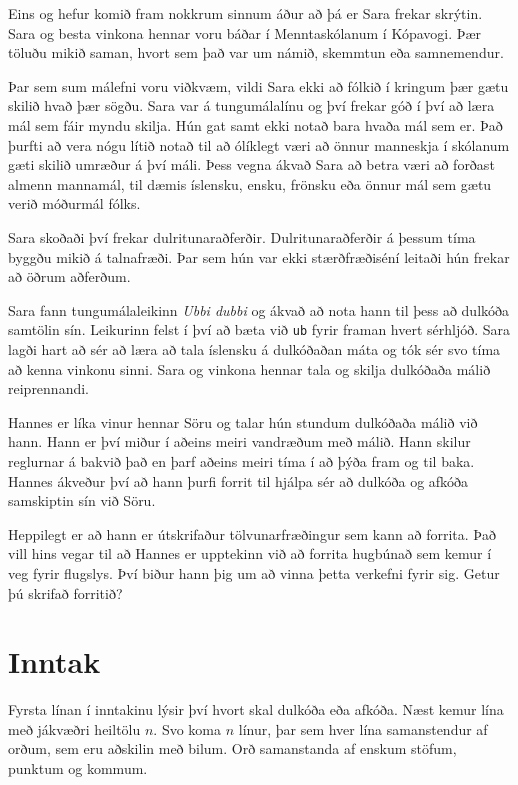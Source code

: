 
Eins og hefur komið fram nokkrum sinnum áður að þá er Sara frekar skrýtin.
Sara og besta vinkona hennar voru báðar í Menntaskólanum í Kópavogi.
Þær töluðu mikið saman, hvort sem það var um námið, skemmtun eða samnemendur.

Þar sem sum málefni voru viðkvæm, vildi Sara ekki að fólkið í kringum þær gætu skilið hvað þær sögðu.
Sara var á tungumálalínu og því frekar góð í því að læra mál sem fáir myndu skilja.
Hún gat samt ekki notað bara hvaða mál sem er.
Það þurfti að vera nógu lítið notað til að ólíklegt væri að önnur manneskja í skólanum gæti skilið umræður á því máli.
Þess vegna ákvað Sara að betra væri að forðast almenn mannamál, til dæmis íslensku, ensku, frönsku eða önnur mál sem gætu verið móðurmál fólks.

Sara skoðaði því frekar dulritunaraðferðir.
Dulritunaraðferðir á þessum tíma byggðu mikið á talnafræði.
Þar sem hún var ekki stærðfræðiséní leitaði hún frekar að öðrum aðferðum.

Sara fann tungumálaleikinn \emph{Ubbi dubbi} og ákvað að nota hann til þess að dulkóða samtölin sín.
Leikurinn felst í því að bæta við \texttt{ub} fyrir framan hvert sérhljóð.
Sara lagði hart að sér að læra að tala íslensku á dulkóðaðan máta og tók sér svo tíma að kenna vinkonu sinni.
Sara og vinkona hennar tala og skilja dulkóðaða málið reiprennandi.

Hannes er líka vinur hennar Söru og talar hún stundum dulkóðaða málið við hann.
Hann er því miður í aðeins meiri vandræðum með málið.
Hann skilur reglurnar á bakvið það en þarf aðeins meiri tíma í að þýða fram og til baka.
Hannes ákveður því að hann þurfi forrit til hjálpa sér að dulkóða og afkóða samskiptin sín við Söru.

Heppilegt er að hann er útskrifaður tölvunarfræðingur sem kann að forrita.
Það vill hins vegar til að Hannes er upptekinn við að forrita hugbúnað sem kemur í veg fyrir flugslys.
Því biður hann þig um að vinna þetta verkefni fyrir sig.
Getur þú skrifað forritið?

\section*{Inntak}
Fyrsta línan í inntakinu lýsir því hvort skal dulkóða eða afkóða.
Næst kemur lína með jákvæðri heiltölu $n$.
Svo koma $n$ línur, þar sem hver lína samanstendur af orðum, sem eru aðskilin með bilum.
Orð samanstanda af enskum stöfum, punktum og kommum.

